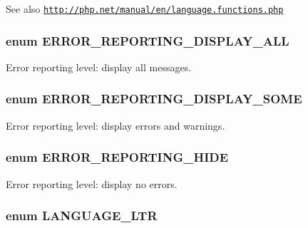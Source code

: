 \begin{DoxySeeAlso}{See also}
\href{http://php.net/manual/en/language.functions.php}{\tt http://php.net/manual/en/language.functions.php} 
\end{DoxySeeAlso}
\hypertarget{bootstrap_8inc_af3c9cac6c517f03e57d03ac5e0c7efb2}{
\subsubsection[{ERROR\_\-REPORTING\_\-DISPLAY\_\-ALL}]{\setlength{\rightskip}{0pt plus 5cm}enum {\bf ERROR\_\-REPORTING\_\-DISPLAY\_\-ALL}}}
\label{bootstrap_8inc_af3c9cac6c517f03e57d03ac5e0c7efb2}
Error reporting level: display all messages. \hypertarget{bootstrap_8inc_a566b6dd0064dc70e81cb192a978bb3fc}{
\subsubsection[{ERROR\_\-REPORTING\_\-DISPLAY\_\-SOME}]{\setlength{\rightskip}{0pt plus 5cm}enum {\bf ERROR\_\-REPORTING\_\-DISPLAY\_\-SOME}}}
\label{bootstrap_8inc_a566b6dd0064dc70e81cb192a978bb3fc}
Error reporting level: display errors and warnings. \hypertarget{bootstrap_8inc_a51db8c6c6fe8ff2e55190c0422fd042b}{
\subsubsection[{ERROR\_\-REPORTING\_\-HIDE}]{\setlength{\rightskip}{0pt plus 5cm}enum {\bf ERROR\_\-REPORTING\_\-HIDE}}}
\label{bootstrap_8inc_a51db8c6c6fe8ff2e55190c0422fd042b}
Error reporting level: display no errors. \hypertarget{bootstrap_8inc_a8790965df4de009fe8bdcf17f6a5c738}{
\subsubsection[{LANGUAGE\_\-LTR}]{\setlength{\rightskip}{0pt plus 5cm}enum {\bf LANGUAGE\_\-LTR}}}
